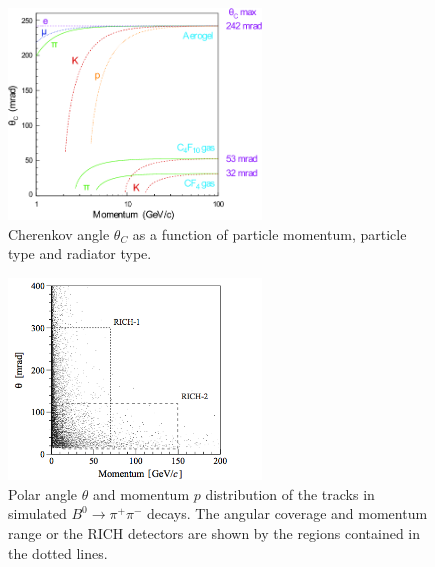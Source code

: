 \begin{figure}[htbp]
	\begin{center}
		\includegraphics[width=0.6\textwidth]{./Chapters/detector/rich/radiators.png}
		\caption{Cherenkov angle $\theta_C$ as a function of particle momentum, particle type and radiator type.}
		\label{fig: radiators}
	\end{center}
\end{figure}


\begin{figure}[htbp]
	\begin{center}
		\includegraphics[width=0.6\textwidth]{./Chapters/detector/rich/rich_angular_and_momentum_coverage.png}
		\caption{Polar angle $\theta$ and momentum $p$ distribution of the tracks in simulated $B^0\rightarrow \pi^+\pi^-$ decays. The angular coverage and momentum range or the RICH detectors are shown by the regions contained in the dotted lines.}
		\label{fig: rich_angular_and_momentum_coverage}
	\end{center}
\end{figure}

